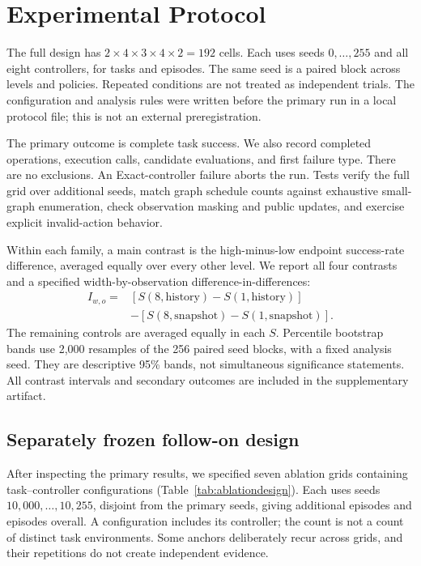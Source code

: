 \documentclass[sigconf,nonacm]{acmart}
\begin{document}
\section{Experimental Protocol}
The full design has $2\times4\times3\times4\times2=192$ cells.
Each uses seeds $0,\ldots,255$ and all eight controllers, for
\TaskCount{} tasks and \EpisodeCount{} episodes. The same seed is a paired
block across levels and policies. Repeated conditions are not treated as
independent trials. The configuration and analysis rules were written
before the primary run in a local protocol file; this is not an external
preregistration.

The primary outcome is complete task success. We also record completed
operations, execution calls, candidate evaluations, and first failure type.
There are no exclusions. An Exact-controller failure aborts the run.
Tests verify the full grid over additional seeds, match graph schedule
counts against exhaustive small-graph enumeration, check observation
masking and public updates, and exercise explicit invalid-action behavior.

Within each family, a main contrast is the high-minus-low endpoint
success-rate difference, averaged equally over every other level.
We report all four contrasts and a specified width-by-observation
difference-in-differences:
\begin{align*}
 I_{w,o}={}&[S(8,\text{history})-S(1,\text{history})]\\
          &-[S(8,\text{snapshot})-S(1,\text{snapshot})].
\end{align*}
The remaining controls are averaged equally in each $S$.
Percentile bootstrap bands use 2,000 resamples of the 256 paired seed blocks,
with a fixed analysis seed. They are descriptive 95\% bands, not
simultaneous significance statements. All contrast intervals and secondary
outcomes are included in the supplementary artifact.

\subsection{Separately frozen follow-on design}
After inspecting the primary results, we specified seven ablation grids
containing \ExtendedCaseCount{} task--controller configurations
(Table~\ref{tab:ablationdesign}). Each uses seeds $10{,}000,\ldots,10{,}255$,
disjoint from the primary seeds, giving \ExtendedEpisodeCount{} additional
episodes and \TotalEpisodeCount{} episodes overall. A configuration includes
its controller; the count is not a count of distinct task environments.
Some anchors deliberately recur across grids, and their repetitions do
not create independent evidence.
\end{document}
